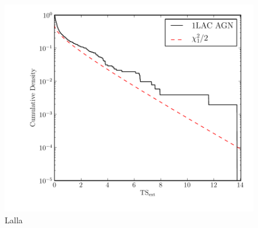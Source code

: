 \documentclass[preprint]{aastex}
\begin{document}
\begin{figure}
  \begin{center}
    \includegraphics{source_plots/agn.pdf}
    \end{center}
    \caption{Lalla}\label{agn_ts_ext}
  \end{figure}
\end{document}

